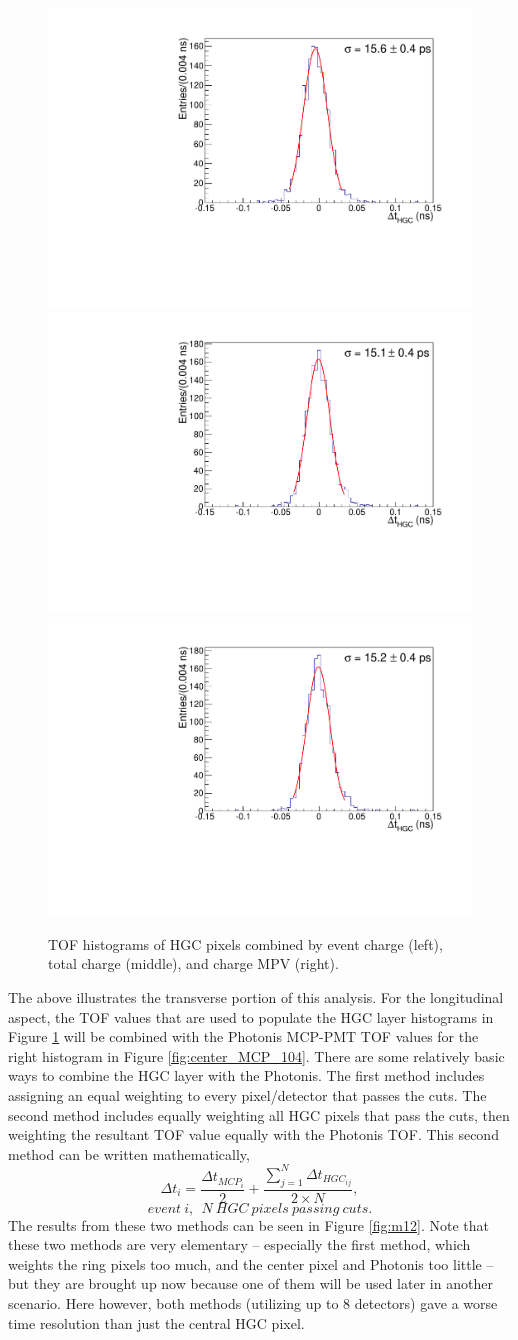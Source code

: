 \documentclass[twocolumn,aps,prd,reprint,superscriptaddress,floatfix]{revtex4-1}
\begin{document}
\begin{figure}[!htbp]
\centering
	\includegraphics[width=.32\textwidth]{deltaTPicoSilEventCharge104.pdf}
	\includegraphics[width=.32\textwidth]{deltaTPicoSilTotalCharge104.pdf}
	\includegraphics[width=.32\textwidth]{deltaTPicoSilLandauCharge104.pdf}
	\caption{TOF histograms of HGC pixels combined by event charge (left), total charge (middle), and charge MPV (right).}
	\label{fig:HGC_event_total_MPV_104}
\end{figure}

The above illustrates the transverse portion of this analysis. 
For the longitudinal aspect, the TOF values that are used to populate the HGC layer histograms in Figure \ref{fig:HGC_event_total_MPV_104} will be combined with the Photonis MCP-PMT TOF values for the right histogram in Figure \ref{fig:center_MCP_104}.
There are some relatively basic ways to combine the HGC layer with the Photonis.
The first method includes assigning an equal weighting to every pixel/detector that passes the cuts.
The second method includes equally weighting all HGC pixels that pass the cuts, then weighting the resultant TOF value equally with the Photonis TOF.
This second method can be written mathematically,
\[
\Delta t_i = \dfrac{ \Delta t_{MCP_i} }{2} + \dfrac{\sum\limits_{j=1}^N \Delta t_{HGC_{ij}} }{2\times N},
\]
\[
event\ i,\ \ N\ HGC\ pixels\ passing\ cuts.
\]
The results from these two methods can be seen in Figure \ref{fig:m12}. 
Note that these two methods are very elementary -- especially the first method, which weights the ring pixels too much, and the center pixel and Photonis too little -- but they are brought up now because one of them will be used later in another scenario. 
Here however, both methods (utilizing up to 8 detectors) gave a worse time resolution than just the central HGC pixel.
\end{document}
